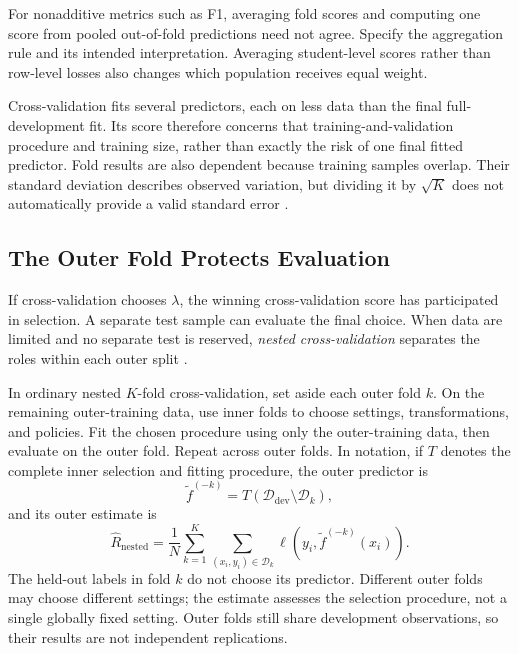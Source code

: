 For nonadditive metrics such as F1, averaging fold scores and computing one score from pooled out-of-fold predictions need not agree. Specify the aggregation rule and its intended interpretation. Averaging student-level scores rather than row-level losses also changes which population receives equal weight.

Cross-validation fits several predictors, each on less data than the final full-development fit. Its score therefore concerns that training-and-validation procedure and training size, rather than exactly the risk of one final fitted predictor. Fold results are also dependent because training samples overlap. Their standard deviation describes observed variation, but dividing it by $\sqrt K$ does not automatically provide a valid standard error \citep{bengio2004cv}.

\subsection{The Outer Fold Protects Evaluation}

If cross-validation chooses $\lambda$, the winning cross-validation score has participated in selection. A separate test sample can evaluate the final choice. When data are limited and no separate test is reserved, \emph{nested cross-validation} separates the roles within each outer split \citep{cawley2010}.

In ordinary nested $K$-fold cross-validation, set aside each outer fold $k$. On the remaining outer-training data, use inner folds to choose settings, transformations, and policies. Fit the chosen procedure using only the outer-training data, then evaluate on the outer fold. Repeat across outer folds. In notation, if $T$ denotes the complete inner selection and fitting procedure, the outer predictor is
\[
\tilde f^{(-k)}=T(\mathcal D_{\mathrm{dev}}\setminus\mathcal D_k),
\]
and its outer estimate is
\[
\hat R_{\mathrm{nested}}
=\frac1N\sum_{k=1}^K\sum_{(x_i,y_i)\in\mathcal D_k}
\ell(y_i,\tilde f^{(-k)}(x_i)).
\]
The held-out labels in fold $k$ do not choose its predictor. Different outer folds may choose different settings; the estimate assesses the selection procedure, not a single globally fixed setting. Outer folds still share development observations, so their results are not independent replications.

